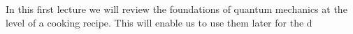 In this first lecture we will review the foundations of quantum mechanics at the level of a cooking recipe. This will enable us to use them later for the d